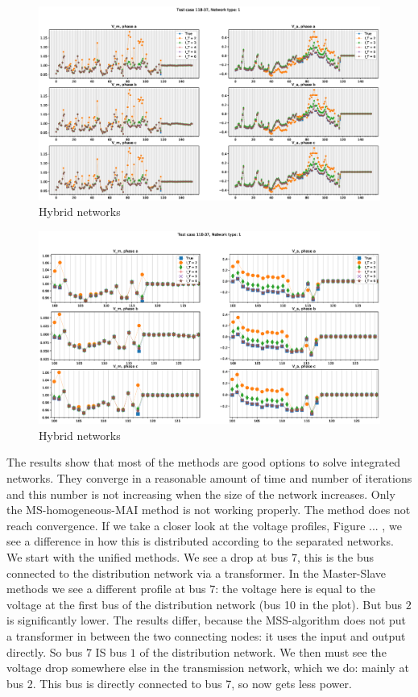 \documentclass[10pt,journal]{article}
\begin{document}








\newpage 
\begin{figure}
\centering
\includegraphics[width=\textwidth]{Images/MAI_N1.eps}
\caption{Hybrid networks}
\end{figure}
\begin{figure}
\centering
\includegraphics[width=\textwidth]{Images/Z_MAI_N1.eps}
\caption{Hybrid networks}
\end{figure}
\newpage
The results show that most of the methods are good options to solve integrated networks. They converge in a reasonable amount of time and number of iterations and this number is not increasing when the size of the network increases. Only the MS-homogeneous-MAI method is not working properly. The method does not reach convergence. If we take a closer look at the voltage profiles, Figure ... , we see a difference in how this is distributed according to the separated networks. We start with the unified methods. We see a drop at bus $7$, this is the bus connected to the distribution network via a transformer. In the Master-Slave methods we see a different profile at bus $7$: the voltage here is equal to the voltage at the first bus of the distribution network (bus 10 in the plot). But bus $2$ is significantly lower. The results differ, because the MSS-algorithm does not put a transformer in between the two connecting nodes: it uses the input and output directly. So bus $7$ IS bus $1$ of the distribution network. We then must see the voltage drop somewhere else in the transmission network, which we do: mainly at bus 2. This bus is directly connected to bus 7, so now gets less power. \\
\end{document}
